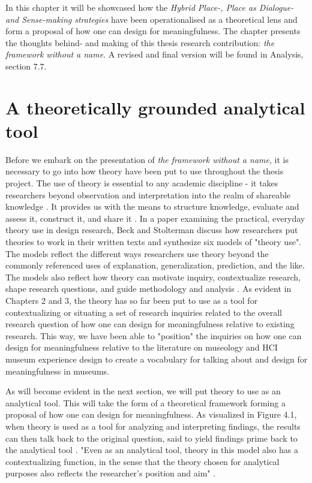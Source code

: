 In this chapter it will be showcased how the \emph{Hybrid Place-, Place as Dialogue- and Sense-making strategies} have been operationalised as a theoretical lens and form a proposal of how one can design for meaningfulness. The chapter presents the thoughts behind- and making of this thesis research contribution: \emph{the framework without a name}. A revised and final version will be found in Analysis, section 7.7.

\section{A theoretically grounded analytical tool}
Before we embark on the presentation of \emph{the framework without a name}, it is necessary to go into how theory have been put to use throughout the thesis project. The use of theory is essential to any academic discipline - it takes researchers beyond observation and interpretation into the realm of shareable knowledge \autocite[p. 126]{beck_examining_2016}. It provides us with the means to structure knowledge, evaluate and assess it, construct it, and share it \autocite[p. 126]{beck_examining_2016}. In a paper examining the practical, everyday theory use in design research, Beck and Stolterman discuss how researchers put theories to work in their written texts and synthesize six models of "theory use". The models reflect the different ways researchers use theory beyond the commonly referenced uses of explanation, generalization, prediction, and the like. The models also reflect how theory can motivate inquiry, contextualize research, shape research questions, and guide methodology and analysis \autocite[p. 134]{beck_examining_2016}. As evident in Chapters 2 and 3, the theory has so far been put to use as a tool for contextualizing or situating a set of research inquiries related to the overall research question of how one can design for meaningfulness relative to existing research. This way, we have been able to "position" the inquiries on how one can design for meaningfulness relative to the literature on museology and HCI museum experience design to create a vocabulary for talking about and design for meaningfulness in museums.

As will become evident in the next section, we will put theory to use as an analytical tool. This will take the form of a theoretical framework forming a proposal of how one can design for meaningfulness. As visualized in Figure 4.1, when theory is used as a tool for analyzing and interpreting findings, the results can then talk back to the original question, said to yield findings prime back to the analytical tool \autocite[p. 133]{beck_examining_2016}. "Even as an analytical tool, theory in this model also has a contextualizing function, in the sense that the theory chosen for analytical purposes also reflects the researcher’s position and aim" \autocite[p. 133]{beck_examining_2016}.

